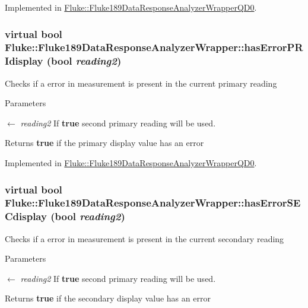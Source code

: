 Implemented in \hyperlink{classFluke_1_1Fluke189DataResponseAnalyzerWrapperQD0_a3f1bdb92d10f341c8b22fa8ee95600b5}{Fluke::Fluke189DataResponseAnalyzerWrapperQD0}.\hypertarget{classFluke_1_1Fluke189DataResponseAnalyzerWrapper_a831296ad9286753efede158c207adc19}{
\subsubsection[{hasErrorPRIdisplay}]{\setlength{\rightskip}{0pt plus 5cm}virtual bool Fluke::Fluke189DataResponseAnalyzerWrapper::hasErrorPRIdisplay (bool {\em reading2})}}
\label{classFluke_1_1Fluke189DataResponseAnalyzerWrapper_a831296ad9286753efede158c207adc19}
Checks if a error in measurement is present in the current primary reading 
\begin{DoxyParams}{Parameters}
\item[\mbox{$\leftarrow$} {\em reading2}]If {\bfseries true} second primary reading will be used. \end{DoxyParams}
\begin{DoxyReturn}{Returns}
{\bfseries true} if the primary display value has an error 
\end{DoxyReturn}


Implemented in \hyperlink{classFluke_1_1Fluke189DataResponseAnalyzerWrapperQD0_aeffd54445d733f8b149c5918589e5b9e}{Fluke::Fluke189DataResponseAnalyzerWrapperQD0}.\hypertarget{classFluke_1_1Fluke189DataResponseAnalyzerWrapper_aa78f02012a5f1803c080bae3e6121286}{
\subsubsection[{hasErrorSECdisplay}]{\setlength{\rightskip}{0pt plus 5cm}virtual bool Fluke::Fluke189DataResponseAnalyzerWrapper::hasErrorSECdisplay (bool {\em reading2})}}
\label{classFluke_1_1Fluke189DataResponseAnalyzerWrapper_aa78f02012a5f1803c080bae3e6121286}
Checks if a error in measurement is present in the current secondary reading 
\begin{DoxyParams}{Parameters}
\item[\mbox{$\leftarrow$} {\em reading2}]If {\bfseries true} second primary reading will be used. \end{DoxyParams}
\begin{DoxyReturn}{Returns}
{\bfseries true} if the secondary display value has an error 
\end{DoxyReturn}


